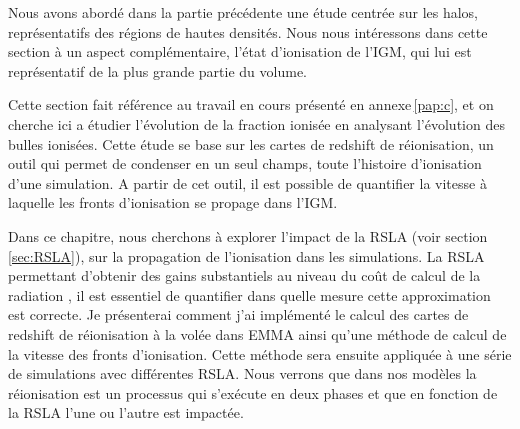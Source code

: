 Nous avons abordé dans la partie précédente une étude centrée sur les halos, représentatifs des régions de hautes densités. %
Nous nous intéressons dans cette section à un aspect complémentaire, l'état d'ionisation de l'\ac{IGM}, qui lui est représentatif de la plus grande partie du volume.

Cette section fait référence au travail en cours présenté en annexe\,\ref{pap:c}, et on cherche ici a étudier l’évolution de la fraction ionisée en analysant l'évolution des bulles ionisées.
Cette étude se base sur les cartes de redshift de réionisation, un outil qui permet de condenser en un seul champs, toute l'histoire d'ionisation d'une simulation.
A partir de cet outil, il est possible de quantifier la vitesse à laquelle les fronts d'ionisation se propage dans l'\ac{IGM}.

Dans ce chapitre, nous cherchons à explorer l'impact de la \ac{RSLA} (voir section \ref{sec:RSLA}), sur la propagation de l'ionisation dans les simulations.
La \ac{RSLA} permettant d'obtenir des gains substantiels au niveau du coût de calcul de la radiation \citep{rosdahl_ramsesrt_2013, aubert_radiative_2008, 2001NewA....6..437G}, il est essentiel de quantifier dans quelle mesure cette approximation est correcte.
Je présenterai comment j'ai implémenté le calcul des cartes de redshift de réionisation à la volée dans EMMA ainsi qu'une méthode de calcul de la vitesse des fronts d'ionisation.
Cette méthode sera ensuite appliquée à une série de simulations avec différentes \ac{RSLA}.
Nous verrons que dans nos modèles la réionisation est un processus qui s’exécute en deux phases et que en fonction de la \ac{RSLA} l'une ou l'autre est impactée.


%


